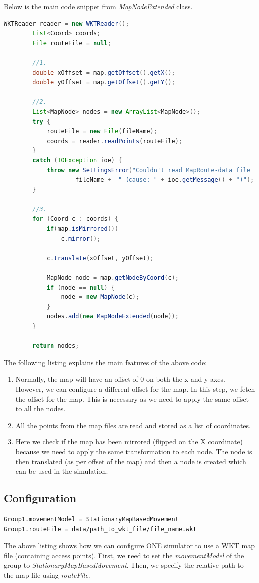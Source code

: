 \vspace{10mm}
Below is the main code snippet from \textit{MapNodeExtended} class.
\vspace{3mm}
\begin{lstlisting}[language=java]
		WKTReader reader = new WKTReader();
		List<Coord> coords;
		File routeFile = null;

		//1.
		double xOffset = map.getOffset().getX();
		double yOffset = map.getOffset().getY();

		//2.
		List<MapNode> nodes = new ArrayList<MapNode>();
		try {
			routeFile = new File(fileName);
			coords = reader.readPoints(routeFile);
		}
		catch (IOException ioe) {
			throw new SettingsError("Couldn't read MapRoute-data file " +
					fileName + 	" (cause: " + ioe.getMessage() + ")");
		}

		//3.
		for (Coord c : coords) {
			if(map.isMirrored())
				c.mirror();

			c.translate(xOffset, yOffset);

			MapNode node = map.getNodeByCoord(c);
			if (node == null) {
				node = new MapNode(c);
			}
			nodes.add(new MapNodeExtended(node));
		}

		return nodes;
\end{lstlisting}
\vspace{5mm}
The following listing explains the main features of the above code:
\begin{enumerate}
	\item Normally, the map will have an offset of 0 on both the x and y axes. However, we can configure a different offset for the map. In this step, we fetch the offset for the map. This is necessary as we need to apply the same offset to all the nodes.
	\item All the points from the map files are read and stored as a list of coordinates.
	\item Here we check if the map has been mirrored (flipped on the X coordinate) because we need to apply the same transformation to each node. The node is then translated (as per offset of the map) and then a node is created which can be used in the simulation.
\end{enumerate}
\subsection{Configuration}
\begin{lstlisting}[language=bash]
Group1.movementModel = StationaryMapBasedMovement
Group1.routeFile = data/path_to_wkt_file/file_name.wkt
\end{lstlisting}
The above listing shows how we can configure ONE simulator to use a WKT map file (containing access points). First, we need to  set the \textit{movementModel} of the group to \textit{StationaryMapBasedMovement}. Then, we specify the relative path to the map file using \textit{routeFile}.
